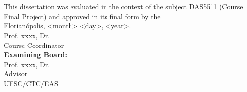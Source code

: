 \imprimircapa

\imprimirfolhaderosto*

\begin{fichacatalografica}
	
\end{fichacatalografica}

\begin{folhadeaprovacao}
	\OnehalfSpacing
	\centering
	\imprimirautor\\%
	\vspace*{10pt}		
	\textbf{\imprimirtitulo}%
	\ifnotempty{\imprimirsubtitulo}{:~\imprimirsubtitulo}\\%
	\vspace*{\baselineskip}
	
	This dissertation was evaluated in the context of the subject DAS5511 (Course Final Project) and approved in its final form by the \imprimircurso\\
	\vspace*{\baselineskip}
	Florianópolis, <month> <day>, <year>.\\
	
	
	\vspace*{2\baselineskip}
	Prof. xxxx, Dr.\\
	Course Coordinator\\
	
	\vspace*{\baselineskip}
	\textbf{Examining Board:} \\
	
	
	\vspace*{2\baselineskip}
	Prof. xxxx, Dr.\\
	Advisor \\
	UFSC/CTC/EAS\\
	

\end{folhadeaprovacao}
